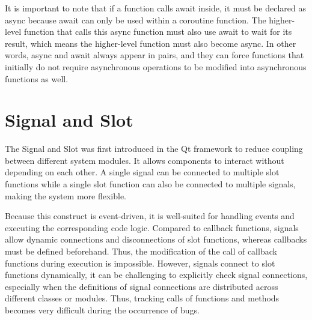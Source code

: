 \documentclass[
english,
ruledheaders=section,%
class=report,%
thesis={type=Report},%
accentcolor=9c,%
custommargins=true,%
marginpar=false,%
parskip=half-,%
fontsize=11pt,%
logofile={img/tuda_logo.pdf}, %
]{tudapub}
\begin{document}

    It is important to note that if a function calls await inside, it must be declared as async because await can only be used within a coroutine function. The higher-level function that calls this async function must also use await to wait for its result, which means the higher-level function must also become async. In other words, async and await always appear in pairs, and they can force functions that initially do not require asynchronous operations to be modified into asynchronous functions as well.

    \section{Signal and Slot}
    \label{sec:signalSlotIntroduction}

    The Signal and Slot was first introduced in the Qt framework to reduce coupling between different system modules. It allows components to interact without depending on each other. A single signal can be connected to multiple slot functions while a single slot function can also be connected to multiple signals, making the system more flexible.

    Because this construct is event-driven, it is well-suited for handling events and executing the corresponding code logic. Compared to callback functions, signals allow dynamic connections and disconnections of slot functions, whereas callbacks must be defined beforehand. Thus, the modification of the call of callback functions during execution is impossible. However, signals connect to slot functions dynamically, it can be challenging to explicitly check signal connections, especially when the definitions of signal connections are distributed across different classes or modules. Thus, tracking calls of functions and methods becomes very difficult during the occurrence of bugs.


\end{document}
